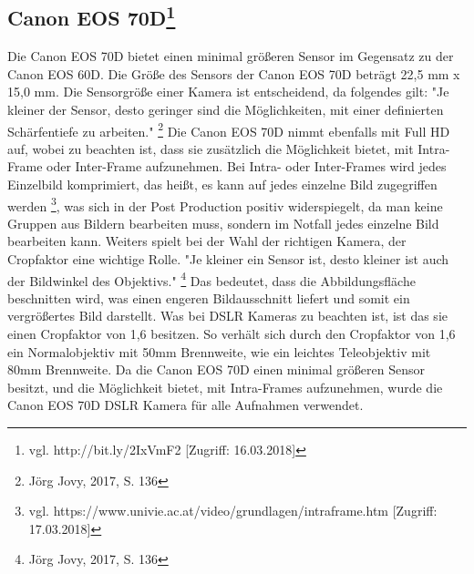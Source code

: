 \subsection[Canon EOS 70D]{Canon EOS 70D\protect\footnote{\label{}vgl. http://bit.ly/2IxVmF2 [Zugriff: 16.03.2018]}} Die Canon EOS 70D bietet einen minimal größeren Sensor im Gegensatz zu der Canon EOS 60D. Die Größe des Sensors der Canon EOS 70D beträgt 22,5 mm x 15,0 mm. Die Sensorgröße einer Kamera ist entscheidend, da folgendes gilt: "Je kleiner der Sensor, desto geringer sind die Möglichkeiten, mit einer definierten Schärfentiefe zu arbeiten."
\footnote{\label{} Jörg Jovy, 2017, S. 136} Die Canon EOS 70D nimmt ebenfalls mit Full HD auf, wobei zu beachten ist, dass sie zusätzlich die Möglichkeit bietet, mit Intra-Frame oder Inter-Frame aufzunehmen. Bei Intra- oder Inter-Frames wird jedes Einzelbild komprimiert, das heißt, es kann auf jedes einzelne Bild zugegriffen werden
\footnote{\label{}vgl. https://www.univie.ac.at/video/grundlagen/intraframe.htm [Zugriff: 17.03.2018]}, was sich in der Post Production positiv widerspiegelt, da man keine Gruppen aus Bildern bearbeiten muss, sondern im Notfall jedes einzelne Bild bearbeiten kann. Weiters spielt bei der Wahl der richtigen Kamera, der Cropfaktor eine wichtige Rolle. "Je kleiner ein Sensor ist, desto kleiner ist auch der Bildwinkel des Objektivs."
\footnote{\label{}Jörg Jovy, 2017, S. 136} Das bedeutet, dass die Abbildungsfläche beschnitten wird, was einen engeren Bildausschnitt liefert und somit ein vergrößertes Bild darstellt. Was bei DSLR Kameras zu beachten ist, ist das sie einen Cropfaktor von 1,6 besitzen. So verhält sich durch den Cropfaktor von 1,6 ein Normalobjektiv mit 50mm Brennweite, wie ein leichtes Teleobjektiv mit 80mm Brennweite. 
Da die Canon EOS 70D einen minimal größeren Sensor besitzt, und die Möglichkeit bietet, mit Intra-Frames aufzunehmen, wurde die Canon EOS 70D DSLR Kamera für alle Aufnahmen verwendet.

